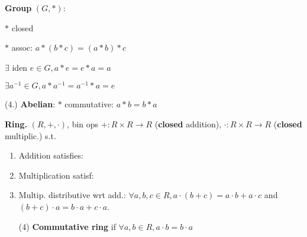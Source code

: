 
\begin{Definition}
\textbf{Group} $(G,*)$:
\begin{enumerate*}[label=\protect\circled{\arabic*}]
  \item[\circled{0}] $*$ closed
  \item $*$ assoc: $a*(b*c)=(a*b)*c$
  \item $\exists$ iden $e\in G, a*e=e*a=a$
  \item $\exists a^{-1}\in G, a*a^{-1}=a^{-1}*a=e$
  \item[(4.)] \textbf{Abelian}: $*$ commutative: $a*b=b*a$
\end{enumerate*}
\end{Definition}

\begin{Definition}
\textbf{Ring.}
$(R,+,\cdot)$, bin ops $+:R\times R\to R$ (\textbf{closed} addition), $\cdot:R\times R\to R$ (\textbf{closed} multiplic.) s.t. 
\begin{enumerate}[leftmargin=4mm]
  \item Addition satisfies:
  \item Multiplication satisf:
  \item Multip. distributive wrt add.: $\forall a,b,c\in R,a\cdot(b+c)=a\cdot b+a\cdot c$ and $(b+c)\cdot a=b\cdot a+c\cdot a$.
  \item[(4)] \textbf{Commutative ring} if $\forall a,b\in R, a\cdot b=b\cdot a$
\end{enumerate}
\end{Definition}

